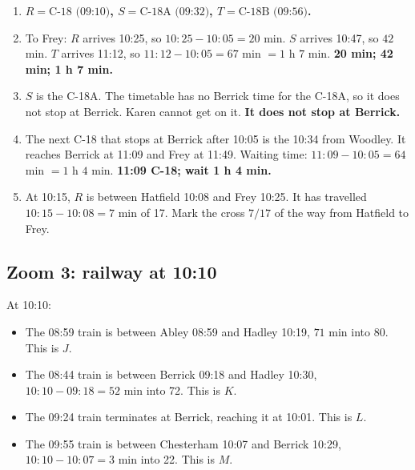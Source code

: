 \documentclass[11pt,a4paper]{article}
\newcommand{\ans}[1]{\textcolor{red!75!black}{\textbf{#1}}}
\begin{document}
\begin{enumerate}[label=\textbf{\alph*)},leftmargin=*]
\item \ans{\(R=\text{C-18 (09:10)}\), \(S=\text{C-18A (09:32)}\), \(T=\text{C-18B (09:56)}\).}
\item To Frey: \(R\) arrives 10:25, so \(10{:}25-10{:}05=20\) min. \(S\) arrives 10:47, so \(42\) min. \(T\) arrives 11:12, so \(11{:}12-10{:}05=67\) min \(=1\) h \(7\) min. \ans{20 min; 42 min; 1 h 7 min.}
\item \(S\) is the C-18A. The timetable has no Berrick time for the C-18A, so it does not stop at Berrick. Karen cannot get on it. \ans{It does not stop at Berrick.}
\item The next C-18 that stops at Berrick after 10:05 is the 10:34 from Woodley. It reaches Berrick at 11:09 and Frey at 11:49. Waiting time: \(11{:}09-10{:}05=64\) min \(=1\) h \(4\) min. \ans{11:09 C-18; wait 1 h 4 min.}
\item At 10:15, \(R\) is between Hatfield 10:08 and Frey 10:25. It has travelled \(10{:}15-10{:}08=7\) min of 17. Mark the cross \(7/17\) of the way from Hatfield to Frey.
\end{enumerate}

\subsection*{Zoom 3: railway at 10:10}
At 10:10:
\begin{itemize}
\item The 08:59 train is between Abley 08:59 and Hadley 10:19, \(71\) min into 80. This is \(J\).
\item The 08:44 train is between Berrick 09:18 and Hadley 10:30, \(10{:}10-09{:}18=52\) min into 72. This is \(K\).
\item The 09:24 train terminates at Berrick, reaching it at 10:01. This is \(L\).
\item The 09:55 train is between Chesterham 10:07 and Berrick 10:29, \(10{:}10-10{:}07=3\) min into 22. This is \(M\).
\end{itemize}
\end{document}
